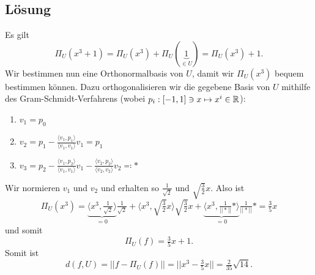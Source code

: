 \subsection{Lösung}
Es gilt
\begin{equation*}
	\Pi_U(x^3+1) = \Pi_U(x^3)+\Pi_U(\underbrace{1}_{\in U}) = \Pi_U(x^3) + 1\text{.}
\end{equation*}
Wir bestimmen nun eine Orthonormalbasis von \( U \), damit wir \( \Pi_U(x^3) \) bequem bestimmen können. Dazu orthogonalisieren wir die gegebene Basis von \( U \) mithilfe des Gram-Schmidt-Verfahrens (wobei \( p_i:[-1,1] \ni x \mapsto x^i \in \mathbb{R} \)):
\begin{enumerate}
	\item \( v_1 = p_0 \)
	\item \( v_2 = p_1 - \tfrac{\langle v_1,p_1 \rangle}{\langle v_1,v_1 \rangle}v_1 = p_1 \)
	\item \( v_3 = p_2 - \tfrac{\langle v_1,p_2 \rangle}{\langle v_1,v_1 \rangle}v_1 - \tfrac{\langle v_2,p_2 \rangle}{\langle v_2,v_2 \rangle}v_2 \eqqcolon \ast \) 
\end{enumerate}
Wir normieren \( v_1 \) und \( v_2 \) und erhalten so \( \tfrac{1}{\sqrt{2}} \) und \( \sqrt{\tfrac{3}{2}}x \). Also ist
\begin{equation*}
	\Pi_U(x^3) = \underbrace{\langle x^3,\tfrac{1}{\sqrt{2}} \rangle}_{=0} \tfrac{1}{\sqrt{2}} + \langle x^3,\sqrt{\tfrac{3}{2}}x \rangle\sqrt{\tfrac{3}{2}}x + \underbrace{\langle x^3,\tfrac{1}{||\ast||}\ast \rangle}_{=0} \tfrac{1}{||\ast||}\ast = \tfrac{3}{5}x
\end{equation*}
und somit
\begin{equation*}
	\Pi_U(f) = \tfrac{3}{5}x+1\text{.}
\end{equation*}
Somit ist
\begin{equation*}
	d(f,U) = ||f - \Pi_U(f)|| = ||x^3-\tfrac{3}{5}x|| = \tfrac{2}{35}\sqrt{14}\text{.}
\end{equation*}